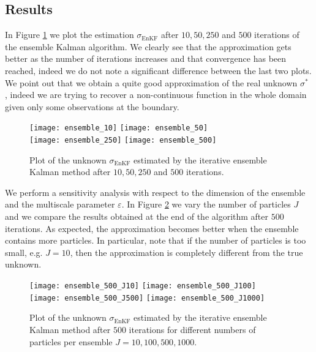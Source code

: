 \subsection{Results}

In Figure \ref{fig:best_solution} we plot the estimation $\sigma_{\mathrm{EnKF}}$ after $10, 50, 250$ and $500$ iterations of the ensemble Kalman algorithm. We clearly see that the approximation gets better as the number of iterations increases and that convergence has been reached, indeed we do not note a significant difference between the last two plots. We point out that we obtain a quite good approximation of the real unknown $\sigma^*$ , indeed we are trying to recover a non-continuous function in the whole domain given only some observations at the boundary.

\begin{figure}[t]
\centering
\texttt{[image: ensemble\_10]}
\texttt{[image: ensemble\_50]}
\\
\texttt{[image: ensemble\_250]}
\texttt{[image: ensemble\_500]}
\caption{Plot of the unknown $\sigma_{\mathrm{EnKF}}$ estimated by the iterative ensemble Kalman method after $10, 50, 250$ and $500$ iterations.}
\label{fig:best_solution}
\end{figure}

We perform a sensitivity analysis with respect to the dimension of the ensemble and the multiscale parameter $\varepsilon$. In Figure \ref{fig:comparison_J} we vary the number of particles $J$ and we compare the results obtained at the end of the algorithm after $500$ iterations. As expected, the approximation becomes better when the ensemble contains more particles. In particular, note that if the number of particles is too small, e.g. $J = 10$, then the approximation is completely different from the true unknown.

\begin{figure}[t]
\centering
\texttt{[image: ensemble\_500\_J10]}
\texttt{[image: ensemble\_500\_J100]}
\\
\texttt{[image: ensemble\_500\_J500]}
\texttt{[image: ensemble\_500\_J1000]}
\caption{Plot of the unknown $\sigma_{\mathrm{EnKF}}$ estimated by the iterative ensemble Kalman method after $500$ iterations for different numbers of particles per ensemble $J = 10, 100, 500, 1000$.}
\label{fig:comparison_J}
\end{figure}

